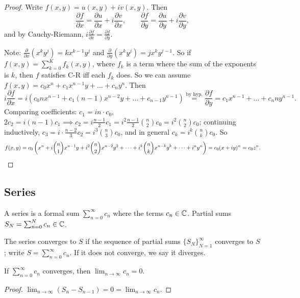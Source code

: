 \documentclass[11pt]{article}
\begin{document}
\begin{proof}
Write $f(x,y) = u(x,y) + iv(x,y)$. Then
\[
\frac{\partial f}{\partial x} = \frac{\partial u}{\partial x} + i\frac{\partial v}{\partial x}, \qquad \frac{\partial f}{\partial y} = \frac{\partial u}{\partial y} + i\frac{\partial v}{\partial y},
\]
and by Cauchy-Riemann, $i\frac{\partial f}{\partial x} = \frac{\partial f}{\partial y}$.

Note: $\frac{\partial}{\partial x}(x^k y^j) = kx^{k-1}y^j$ and $\frac{\partial}{\partial y}(x^ky^j) = jx^ky^{j-1}$.
So if $f(x,y) = \sum_{k=0}^K f_k(x,y)$, where $f_k$ is a term where the sum of the exponents is $k$, then $f$ satisfies C-R iff each $f_k$ does.
So we can assume $f(x,y) = c_0x^n + c_1x^{n-1}y + \dots + c_ny^n$. Then
\[
i\frac{\partial f}{\partial x} = i(c_0nx^{n-1} + c_1(n-1)x^{n-2}y + \dots + c_{n-1}y^{n-1}) \overset{\text{by hyp.}}{=} \frac{\partial f}{\partial y} = c_1x^{n-1} + \dots + c_nny^{n-1}.
\]
Comparing coefficients: $c_1 = in\cdot c_0$, $2c_2 = i(n-1)c_1 \implies c_2 = i\frac{n-1}{2}c_1 = i^2\frac{n-1}{2}\binom{n}{2}c_0 = i^2\binom{n}{2}c_0$; continuing inductively, $c_3 = i\cdot\frac{n-2}{3}c_2 = i^3\binom{n}{3}c_0$, and in general $c_k = i^k\binom{n}{k}c_0$. So
\[
f(x,y) = c_0\left(x^n + i\binom{n}{1}x^{n-1}y + i^2\binom{n}{2}x^{n-2}y^2 + \dots + i^k\binom{n}{k}x^{n-k}y^k + \dots + i^ny^n\right) = c_0(x+iy)^n = c_0z^n. \qedhere
\]
\end{proof}

\subsection{Series}

\begin{definition}[Series]
A series is a formal sum $\sum_{n=0}^\infty c_n$ where the terms $c_n \in {\mathbb{C}}$. Partial sums $S_N = \sum_{n=0}^N c_n \in {\mathbb{C}}$.
\end{definition}

\begin{definition}
The series converges to $S$ if the sequence of partial sums $\{S_N\}_{N=1}^\infty$ converges to $S$; write $S = \sum_{n=0}^\infty c_n$. If it does not converge, we say it diverges.
\end{definition}

\begin{lemma}
If $\sum_{n=0}^\infty c_n$ converges, then $\lim_{n\to\infty} c_n = 0$.
\end{lemma}
\begin{proof}
$\lim_{n\to\infty}(S_n - S_{n-1}) = 0 = \lim_{n\to\infty} c_n$.
\end{proof}
\end{document}

